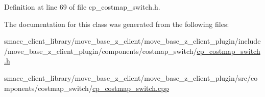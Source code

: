 Definition at line 69 of file cp\+\_\+costmap\+\_\+switch.\+h.



The documentation for this class was generated from the following files\+:\begin{DoxyCompactItemize}
\item 
smacc\+\_\+client\+\_\+library/move\+\_\+base\+\_\+z\+\_\+client/move\+\_\+base\+\_\+z\+\_\+client\+\_\+plugin/include/move\+\_\+base\+\_\+z\+\_\+client\+\_\+plugin/components/costmap\+\_\+switch/\hyperlink{cp__costmap__switch_8h}{cp\+\_\+costmap\+\_\+switch.\+h}\item 
smacc\+\_\+client\+\_\+library/move\+\_\+base\+\_\+z\+\_\+client/move\+\_\+base\+\_\+z\+\_\+client\+\_\+plugin/src/components/costmap\+\_\+switch/\hyperlink{cp__costmap__switch_8cpp}{cp\+\_\+costmap\+\_\+switch.\+cpp}\end{DoxyCompactItemize}
